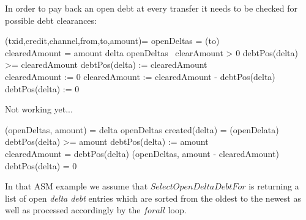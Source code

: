 In order to pay back an open debt at every transfer it needs to be checked for possible debt clearances:

\begin{asm}
	(txid,credit,channel,from,to,amount)=\+
		\LET openDeltas = (to)\\
		\LET clearedAmount = amount\+
			\FORALL delta \IN openDeltas \DO\ \IF clearAmount > 0 \THEN\+
				\IF debtPos(delta) >= clearedAmount \THEN\+
					debtPos(delta) := clearedAmount\\
					clearedAmount := 0\-
				\ELSE\+
					clearedAmount := clearedAmount - debtPos(delta)\\
					debtPos(delta) := 0\-\-
\end{asm}

Not working yet...
\begin{asm}
	(openDeltas, amount) =\+
		\CHOOSE delta \IN openDeltas  \WITH created(delta) = (openDelata) \DO\+
			\IF debtPos(delta) >= amount \THEN\+
					debtPos(delta) := amount\\					
				\ELSE\+
					\LET clearedAmount = debtPos(delta)\+
						(openDeltas, amount - clearedAmount)\\
						debtPos(delta) = 0
\end{asm}

In that ASM example we assume that $SelectOpenDeltaDebtFor$ is returning a list of open \textit{delta debt} entries which are sorted from the oldest to the newest as well as processed accordingly by the $forall$ loop.